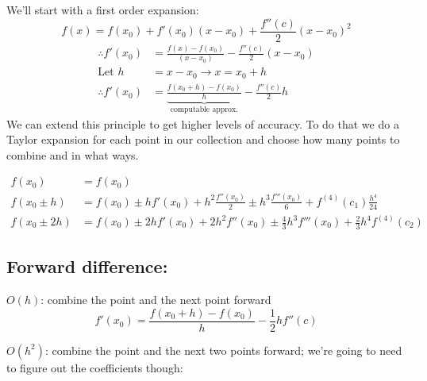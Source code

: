 \documentclass[12pt]{article}
\begin{document}
We'll start with a first order expansion:
\[
f(x) = f(x_0) + f'(x_0)(x - x_0) + \frac{f''(c)}{2}(x-x_0)^2 \]
\begin{align*}
% 
\therefore f'(x_0) &= \frac{f(x) - f(x_0)}{(x - x_0)} - \frac{f''(c)}{2}(x-x_0) \\
%
\text{Let } h &= x-x_0 \rightarrow x = x_0 + h \\
%
\therefore f'(x_0) &= \underbrace{\frac{f(x_0 + h) - f(x_0)}{h}}_{\text{computable approx.}} - \frac{f''(c)}{2}h
\end{align*}
%
We can extend this principle to get higher levels of accuracy. To do that we do a Taylor expansion for each point in our collection and choose how many points to combine and in what ways. 
%
\begin{center}
\end{center}
%
\vspace*{-2em}
\begin{align*}
f(x_0) &= f(x_0)\\
%
f(x_0 \pm h) &= f(x_0) \pm hf'(x_0) + h^2\frac{f''(x_0)}{2} \pm h^3\frac{f'''(x_0)}{6} + f^{(4)}(c_1)\frac{h^4}{24} \\
%
f(x_0 \pm 2h) &= f(x_0) \pm 2h f'(x_0) + 2 h^2 f''(x_0) \pm \frac{4}{3} h^3 f'''(x_0) + \frac{2}{3}h^4 f^{(4)}(c_2)
\end{align*}


\subsection*{Forward difference:}
\underline{$O(h)$}: combine the point and the next point forward
\[f'(x_0) = \frac{f(x_0 + h) - f(x_0)}{h} - \frac{1}{2}hf''(c)\]

\underline{$O(h^2)$}: combine the point and the next two points forward; we're going to need to figure out the coefficients though:
\end{document}
